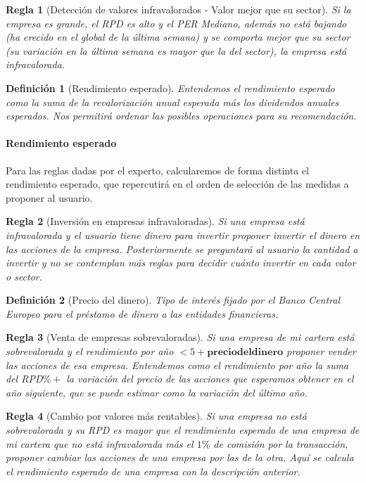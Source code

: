 \documentclass[11pt,leqno]{article}
\theoremstyle{definition_wo_parentheses}
\newtheorem{definicion}{Definición}[subsection]
\theoremstyle{plain}
\newtheorem{regla}{Regla}[subsection]
\theoremstyle{remark}
\begin{document}
\begin{regla}[Detección de valores infravalorados - Valor mejor que su sector]
	Si la empresa es grande, el RPD es alto y el PER Mediano, además no está bajando (ha crecido en el global de la última semana) y se comporta mejor que su sector (su variación en la última semana es mayor que la del sector), la empresa está infravalorada.
\end{regla}	

\begin{definicion}[Rendimiento esperado]
	Entendemos el rendimiento esperado como la suma de la revalorización anual esperada más los dividendos anuales esperados. Nos permitirá ordenar las posibles operaciones para su recomendación.
\end{definicion}

\paragraph{Rendimiento esperado} Para las reglas dadas por el experto, calcularemos de forma distinta el rendimiento esperado, que repercutirá en el orden de selección de las medidas a proponer al usuario.

\begin{regla}[Inversión en empresas infravaloradas]
	 Si una empresa está infravalorada y el usuario tiene  dinero para invertir proponer invertir el dinero en las acciones de la empresa. Posteriormente se preguntará al usuario la cantidad a invertir y no se contemplan más reglas para decidir cuánto invertir en cada valor o sector.
\end{regla}	
	
\begin{definicion}[Precio del dinero]
	Tipo de interés fijado por el Banco Central Europeo para el préstamo de dinero a las entidades financieras. 
\end{definicion}

\begin{regla}[Venta de empresas sobrevaloradas]
	Si una empresa de mi cartera está sobrevalorada y el rendimiento por año $<5 +\mathbf{precio del dinero}$ proponer vender las acciones de esa empresa. Entendemos como el rendimiento por año la suma del RPD$\% +$ la variación del precio de las acciones que esperamos obtener en el año siguiente, que se puede estimar como la variación del último año.
\end{regla}	

\begin{regla}[Cambio por valores más rentables]
	 Si una empresa no está sobrevalorada y su RPD es mayor que el rendimiento esperado de una empresa de mi cartera que no está infravalorada más el $1\%$ de comisión por la transacción, proponer cambiar las acciones de una empresa por las de la otra. Aquí se calcula el rendimiento esperado de una empresa con la descripción anterior.
\end{regla}
\end{document}

